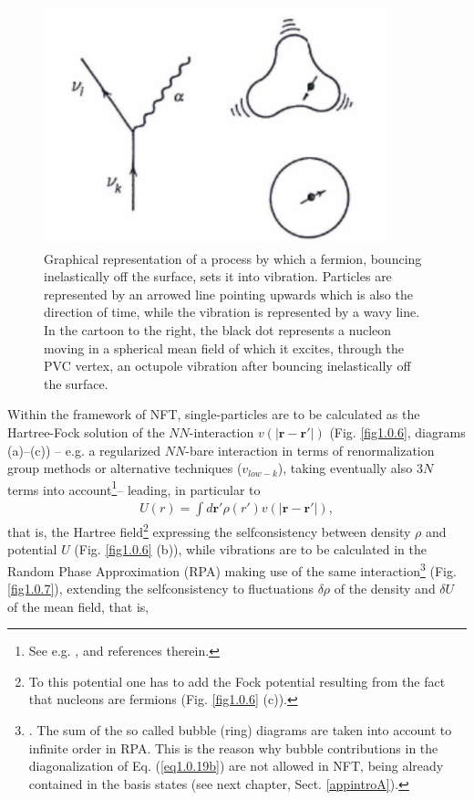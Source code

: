   \begin{figure}
  	\centerline {
  		\includegraphics*[width=10cm]{introduccion/figs/figpreface5}
  	}
  	\caption{Graphical representation of  a process  by which a fermion, bouncing inelastically off the surface, sets it into vibration. Particles are represented by an arrowed line pointing upwards which is also the direction of time, while the vibration is represented by a wavy line. In the cartoon to the right, the black dot represents a nucleon moving in a spherical mean field of which it excites, through the PVC vertex, an octupole vibration after bouncing inelastically off the surface.}
  	\label{fig1.0.5}
  \end{figure}
Within the framework of NFT, single-particles are to be calculated as the Hartree-Fock solution of the $NN$-interaction $v(|\mathbf r-\mathbf r'|)$ (Fig. \ref{fig1.0.6}, diagrams (a)--(c)) -- e.g. a regularized $NN$-bare interaction in terms of renormalization group methods or alternative techniques ($v_{low-k}$), taking eventually also 3$N$ terms into account\footnote{\label{f9}See e.g. \cite{Duguet:13,Duguet:04,Duguet:08,Lesinski:09,Hebeler:09,Baroni:10,Duguet:10,Lesinski:11,Hergert:09}, and references therein.}-- leading, in particular to
\begin{align}\label{eq1.0.18}
U(r)=\int d\mathbf r' \rho(r')v\left(|\mathbf r-\mathbf r'|\right),
\end{align}
that is, the Hartree field\footnote{To this potential one has to add the Fock potential resulting from the fact that nucleons are fermions  (Fig. \ref{fig1.0.6} (c)).} expressing the selfconsistency between density $\rho$ and potential $U$ (Fig. \ref{fig1.0.6} (b)), while vibrations are to be calculated in the Random Phase Approximation (RPA) making use of the same interaction\footnote{\label{f12C1} \cite{Bohm:51,Bohm:53}. The sum of the so called bubble (ring) diagrams are taken into account to infinite order in RPA. This is the reason why bubble contributions in the diagonalization of Eq. (\ref{eq1.0.19b}) are not allowed in NFT, being already contained in the basis states (see next chapter, Sect. \ref{appintroA}).} (Fig. \ref{fig1.0.7}), extending the selfconsistency to fluctuations $\delta\rho$ of the density and $\delta U$ of the mean field, that is,
